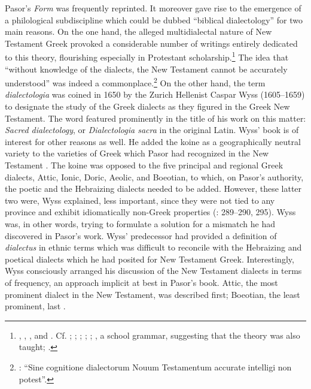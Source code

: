 Pasor’s \textit{Form} was frequently reprinted. It moreover gave rise to the emergence of a philological subdiscipline which could be dubbed “biblical dialectology” for two main reasons. On the one hand, the alleged multidialectal nature of New Testament Greek provoked a considerable number of writings entirely dedicated to this theory, flourishing especially in Protestant scholarship.\footnote{\citet{Wyss1650}, \citet{Olearius1668}, \citet{Leusden1670}, and \citet{Nibbe1755}. Cf. \citet[347]{Parr1686}; \citet[18-19]{Von1705}; \citet[9-10]{Florinus1707}; \citet[\textsc{d.2}\textsc{\textsuperscript{r}}; \textsc{d.5}\textsc{\textsuperscript{v}}]{Thryllitsch1709}; \citet[18]{Reinhard1724}; \citet[121-122]{Holmes1735}, a school grammar, suggesting that the theory was also taught; \citet[136-137]{Walch1772}.} The idea that “without knowledge of the dialects, the New Testament cannot be accurately understood” was indeed a commonplace.\footnote{\citet[\textsc{d.5}\textsc{\textsuperscript{v}}]{Thryllitsch1709}: “Sine cognitione dialectorum Nouum Testamentum accurate intelligi non potest”.} On the other hand, the term \textit{dialectologia} was coined in 1650 by the Zurich Hellenist Caspar Wyss (1605–1659) to designate the study of the Greek dialects as they figured in the Greek New Testament. The word featured prominently in the title of his work on this matter: \textit{Sacred dialectology}, or \textit{Dialectologia sacra} in the original Latin. Wyss’ book is of interest for other reasons as well. He added the koine as a geographically neutral variety to the varieties of Greek which Pasor had recognized in the New Testament \citep[3]{Wyss1650}. The koine was opposed to the five principal and regional Greek dialects, Attic, Ionic, Doric, Aeolic, and Boeotian, to which, on Pasor’s authority, the poetic and the Hebraizing dialects needed to be added. However, these latter two were, Wyss explained, less important, since they were not tied to any province and exhibit idiomatically non-Greek properties (\citealt{Wyss1650}: 289–290, 295). Wyss was, in other words, trying to formulate a solution for a mismatch he had discovered in Pasor’s work. Wyss’ predecessor had provided a definition of \textit{dialectus} in ethnic terms which was difficult to reconcile with the Hebraizing and poetical dialects which he had posited for New Testament Greek. Interestingly, Wyss consciously arranged his discussion of the New Testament dialects in terms of frequency, an approach implicit at best in Pasor’s book. Attic, the most prominent dialect in the New Testament, was described first; Boeotian, the least prominent, last \citep[4]{Wyss1650}.

